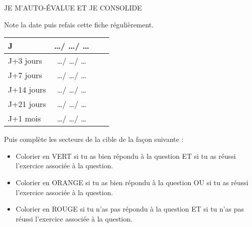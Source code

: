 \documentclass[10pt,a4paper,landscape]{article}
\begin{document}
\begin{minipage}[t][21cm]{13cm}
		\begin{center}
			\uppercase{je m'auto-évalue et je consolide}
		\end{center}
	Note la date puis refais cette fiche régulièrement.  
	\begin{center}
		\begin{tabular}{|l|c|c|c|}
			\hline
			J & \ldots / \ldots / \ldots   \\
			\hline
			J+3 jours  & \ldots / \ldots / \ldots  \\
			\hline
			J+7 jours  & \ldots / \ldots / \ldots  \\
			\hline
			J+14 jours & \ldots / \ldots / \ldots   \\
			\hline
			J+21 jours & \ldots / \ldots / \ldots  \\
			\hline
			J+1 mois   & \ldots / \ldots / \ldots   \\
			\hline
		\end{tabular}
	\end{center}
Puis complète les secteurs de la cible de la façon suivante : 
\begin{itemize}
	\item Colorier en VERT si tu as bien répondu à la question ET si tu as réussi l’exercice associée à la question.
	\item Colorier en ORANGE si tu as bien répondu à la question OU si tu as réussi l’exercice associée à la question.
	\item Colorier en ROUGE si tu n’as pas répondu à la question ET si tu n’as pas réussi l’exercice associée à la question.
\end{itemize}
\begin{center}
\end{center}
	\end{minipage}%
	\hfill%
\end{document}
